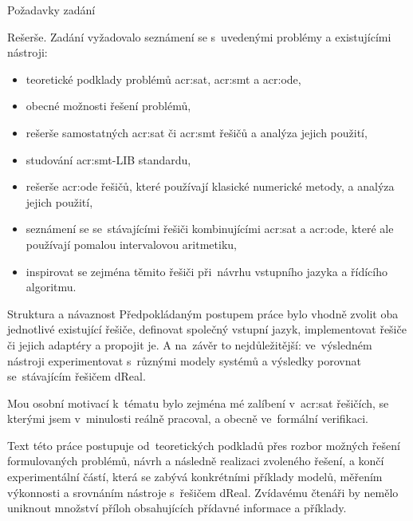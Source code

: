 \documentclass[thesis=M,czech]{FITthesis}[2012/06/26]
\newcommand{\acrlabel}[1]{acr:#1}
\newcommand{\acr}[1]{\acrshort{\acrlabel{#1}}}
\begin{document}
\begin{introduction}
\begin{section}{Požadavky zadání}
\begin{paragraph}{Rešerše.}\label{p:intro:req:search}
Zadání vyžadovalo seznámení se
s~uvedenými problémy a existujícími nástroji:
\begin{itemize}
\item teoretické podklady problémů \acr{sat}, \acr{smt} a \acr{ode},
\item obecné možnosti řešení problémů,
\item rešerše samostatných \acr{sat} či \acr{smt} řešičů
   a analýza jejich použití,
\item studování \acr{smt}-LIB standardu,
\item rešerše \acr{ode} řešičů, které používají klasické numerické metody,
   a analýza jejich použití,
\item seznámení se se~stávajícími řešiči kombinujícími
   \acr{sat} a \acr{ode},
   které ale používají pomalou intervalovou aritmetiku,
\item inspirovat se zejména těmito řešiči
   při~návrhu vstupního jazyka a řídícího algoritmu.
\end{itemize}
\end{paragraph} %


\end{section} %


\begin{section}{Struktura a návaznost}\label{s:intro:struct}
Předpokládaným postupem práce
bylo vhodně zvolit
oba jednotlivé existující řešiče,
definovat společný vstupní jazyk,
implementovat řešiče či jejich adaptéry
a propojit je.
A na~závěr to nejdůležitější:
ve~výsledném nástroji
experimentovat s~různými modely systémů
a výsledky porovnat se~stávajícím řešičem dReal.

Mou osobní motivací k~tématu bylo zejména mé zalíbení
v~\acr{sat} řešičích, se kterými jsem v~minulosti reálně pracoval,
a obecně ve~formální verifikaci.

Text této práce postupuje od~teoretických podkladů
přes rozbor možných řešení formulovaných problémů,
návrh a následně realizaci zvoleného řešení,
a končí experimentální částí,
která se zabývá konkrétními příklady modelů,
měřením výkonnosti a srovnáním nástroje s~řešičem dReal.
Zvídavému čtenáři by nemělo uniknout
množství příloh obsahujících
přídavné informace a příklady.
\end{section} %


\end{introduction}
\end{document}
